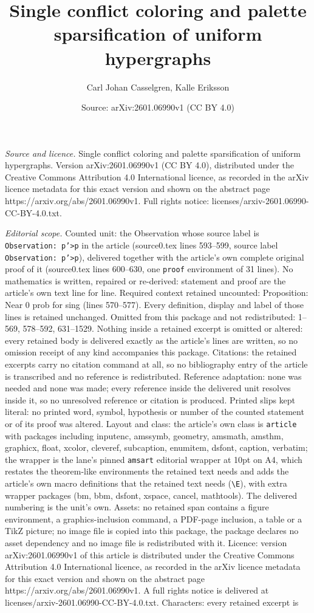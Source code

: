 \documentclass[10pt,a4paper]{amsart}
\title[Single conflict coloring and palette sparsification of unifo]{Single conflict coloring and palette sparsification of uniform hypergraphs}
\author{Carl Johan Casselgren, Kalle Eriksson}
\date{Source: arXiv:2601.06990v1 (CC BY 4.0)}
\begin{document}
\maketitle

\noindent\emph{Source and licence.} Single conflict coloring and palette sparsification of uniform hypergraphs. Version arXiv:2601.06990v1 (CC BY 4.0), distributed under the Creative Commons Attribution 4.0 International licence, as recorded in the arXiv licence metadata for this exact version and shown on the abstract page https://arxiv.org/abs/2601.06990v1. Full rights notice: licenses/arxiv-2601.06990-CC-BY-4.0.txt.\par\smallskip

\noindent\textit{Editorial scope.} Counted unit: the Observation whose source label is \texttt{Observation: p'>p} in the article (source0.tex lines 593--599, source label \texttt{Observation: p'>p}), delivered together with the article's own complete original proof of it (source0.tex lines 600--630, one \texttt{proof} environment of 31 lines). No mathematics is written, repaired or re-derived: statement and proof are the article's own text line for line. Required context retained uncounted: Proposition: Near 0 prob for sing (lines 570--577). Every definition, display and label of those lines is retained unchanged. Omitted from this package and not redistributed: 1--569, 578--592, 631--1529. Nothing inside a retained excerpt is omitted or altered: every retained body is delivered exactly as the article's lines are written, so no omission receipt of any kind accompanies this package. Citations: the retained excerpts carry no citation command at all, so no bibliography entry of the article is transcribed and no reference is redistributed. Reference adaptation: none was needed and none was made; every reference inside the delivered unit resolves inside it, so no unresolved reference or citation is produced. Printed slips kept literal: no printed word, symbol, hypothesis or number of the counted statement or of its proof was altered. Layout and class: the article's own class is \texttt{article} with packages including inputenc, amssymb, geometry, amsmath, amsthm, graphicx, float, xcolor, cleveref, subcaption, enumitem, dsfont, caption, verbatim; the wrapper is the lane's pinned \texttt{amsart} editorial wrapper at 10pt on A4, which restates the theorem-like environments the retained text needs and adds the article's own macro definitions that the retained text needs (\texttt{\textbackslash E}), with extra wrapper packages (bm, bbm, dsfont, xspace, cancel, mathtools). The delivered numbering is the unit's own. Assets: no retained span contains a figure environment, a graphics-inclusion command, a PDF-page inclusion, a table or a TikZ picture; no image file is copied into this package, the package declares no asset dependency and no image file is redistributed with it. Licence: version arXiv:2601.06990v1 of this article is distributed under the Creative Commons Attribution 4.0 International licence, as recorded in the arXiv licence metadata for this exact version and shown on the abstract page https://arxiv.org/abs/2601.06990v1. A full rights notice is delivered at licenses/arxiv-2601.06990-CC-BY-4.0.txt. Characters: every retained excerpt is 
\end{document}
